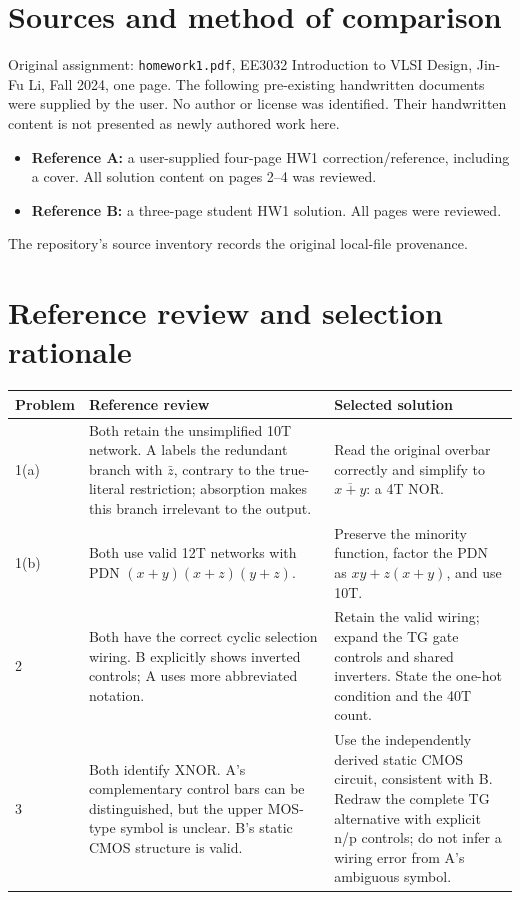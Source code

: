 \documentclass[11pt,a4paper]{article}
\begin{document}
\section*{Sources and method of comparison}
Original assignment: \texttt{homework1.pdf}, EE3032 Introduction to VLSI Design,
Jin-Fu Li, Fall 2024, one page. The following pre-existing handwritten documents
were supplied by the user. No author or license was identified. Their handwritten
content is not presented as newly authored work here.
\begin{itemize}
 \item \textbf{Reference A:} a user-supplied four-page HW1 correction/reference,
 including a cover. All solution content on pages 2--4 was reviewed.
 \item \textbf{Reference B:} a three-page student HW1 solution. All pages were reviewed.
\end{itemize}
The repository's source inventory records the original local-file provenance.

\newpage
\section*{Reference review and selection rationale}
\begin{tabular}{p{.09\linewidth}p{.39\linewidth}p{.43\linewidth}}\toprule
Problem&Reference review&Selected solution\\\midrule
1(a)&Both retain the unsimplified 10T network. A labels the redundant branch
with $\bar z$, contrary to the true-literal restriction; absorption makes this
branch irrelevant to the output.&
Read the original overbar correctly and simplify to $\overline{x+y}$: a 4T NOR.\\
1(b)&Both use valid 12T networks with PDN $(x+y)(x+z)(y+z)$.&
Preserve the minority function, factor the PDN as $xy+z(x+y)$, and use 10T.\\
2&Both have the correct cyclic selection wiring. B explicitly shows inverted
controls; A uses more abbreviated notation.&
Retain the valid wiring; expand the TG gate controls and shared inverters.
State the one-hot condition and the 40T count.\\
3&Both identify XNOR. A's complementary control bars can be distinguished, but
the upper MOS-type symbol is unclear. B's static CMOS structure is valid.&
Use the independently derived static CMOS circuit, consistent with B. Redraw
the complete TG alternative with explicit n/p controls; do not infer a wiring
error from A's ambiguous symbol.\\\bottomrule
\end{tabular}
\end{document}
